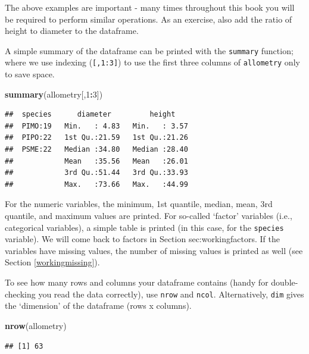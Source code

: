 \documentclass[]{book}
\newenvironment{Shaded}{\begin{snugshade}}{\end{snugshade}}
\newcommand{\DecValTok}[1]{\textcolor[rgb]{0.00,0.00,0.81}{#1}}
\newcommand{\KeywordTok}[1]{\textcolor[rgb]{0.13,0.29,0.53}{\textbf{#1}}}
\newcommand{\NormalTok}[1]{#1}
\newcommand{\OperatorTok}[1]{\textcolor[rgb]{0.81,0.36,0.00}{\textbf{#1}}}
\let\BeginKnitrBlock\begin \let\EndKnitrBlock\end
\begin{document}
\BeginKnitrBlock{rmdtry}
The above examples are important - many times throughout this book you will be required to perform similar operations. As an exercise, also add the ratio of height to diameter to the dataframe.
\EndKnitrBlock{rmdtry}

A simple summary of the dataframe can be printed with the \texttt{summary} function; where we use indexing (\texttt{{[},1:3{]}}) to use the first three columns of \texttt{allometry} only to save space.

\begin{Shaded}
\begin{Highlighting}[]
\KeywordTok{summary}\NormalTok{(allometry[,}\DecValTok{1}\OperatorTok{:}\DecValTok{3}\NormalTok{])}
\end{Highlighting}
\end{Shaded}

\begin{verbatim}
##  species      diameter         height     
##  PIMO:19   Min.   : 4.83   Min.   : 3.57  
##  PIPO:22   1st Qu.:21.59   1st Qu.:21.26  
##  PSME:22   Median :34.80   Median :28.40  
##            Mean   :35.56   Mean   :26.01  
##            3rd Qu.:51.44   3rd Qu.:33.93  
##            Max.   :73.66   Max.   :44.99
\end{verbatim}

For the numeric variables, the minimum, 1st quantile, median, mean, 3rd quantile, and maximum values are printed. For so-called `factor' variables (i.e., categorical variables), a simple table is printed (in this case, for the \texttt{species} variable). We will come back to factors in Section sec:workingfactors. If the variables have missing values, the number of missing values is printed as well (see Section \ref{workingmissing}).

To see how many rows and columns your dataframe contains (handy for double-checking you read the data correctly), use \texttt{nrow} and \texttt{ncol}. Alternatively, \texttt{dim} gives the `dimension' of the dataframe (rows x columns).

\begin{Shaded}
\begin{Highlighting}[]
\KeywordTok{nrow}\NormalTok{(allometry)}
\end{Highlighting}
\end{Shaded}

\begin{verbatim}
## [1] 63
\end{verbatim}
\end{document}
